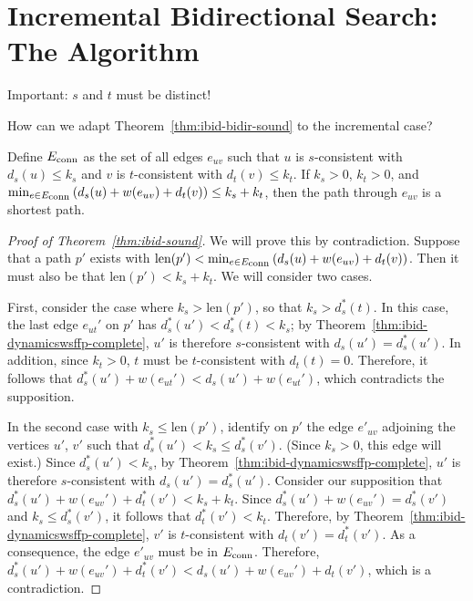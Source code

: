 \section{Incremental Bidirectional Search: The Algorithm}
\label{sef:ibid:ibid}

Important: $s$ and $t$ must be distinct!

How can we adapt Theorem~\ref{thm:ibid-bidir-sound}
to the incremental case?

\begin{theorem}
Define $E_{\mbox{\scriptsize conn}}$ as the set of all edges $e_{uv}$ such that
$u$ is $s$-consistent with $d_s(u) \leq k_s$
and $v$ is $t$-consistent with $d_t(v) \leq k_t$.
If $k_s > 0$, $k_t > 0$,
and
$\min_{e \in E_{\mbox{\scriptsize conn}}} \left( d_s(u) + w(e_{uv}) + d_t(v) \right)
   \leq k_s + k_t$,
then the path through $e_{uv}$ is a shortest path.
\label{thm:ibid-sound}
\end{theorem}

\begin{proof}[Proof of Theorem~\ref{thm:ibid-sound}]
We will prove this by contradiction.
Suppose that a path $p'$ exists with
$\mbox{len}(p') < \min_{e \in E_{\mbox{\scriptsize conn}}} \left( d_s(u) + w(e_{uv}) + d_t(v) \right)$.
Then it must also be that
$\mbox{len}(p') < k_s + k_t$.
We will consider two cases.

First, consider the case where $k_s > \mbox{len}(p')$,
so that $k_s > d_s^*(t)$.
In this case,
the last edge $e_{ut}'$ on $p'$
has $d_s^*(u') < d_s^*(t) < k_s$;
by Theorem~\ref{thm:ibid-dynamicswsffp-complete},
$u'$ is therefore $s$-consistent with $d_s(u') = d_s^*(u')$.
In addition,
since $k_t > 0$,
$t$ must be $t$-consistent with $d_t(t) = 0$.
Therefore,
it follows that $d_s^*(u') + w(e_{ut}') < d_s(u') + w(e_{ut}')$,
which contradicts the supposition.

In the second case with $k_s \leq \mbox{len}(p')$,
identify on $p'$ the edge $e'_{uv}$ adjoining the vertices $u'$, $v'$
such that $d_s^*(u') < k_s \leq d_s^*(v')$.
(Since $k_s > 0$, this edge will exist.)
Since $d_s^*(u') < k_s$,
by Theorem~\ref{thm:ibid-dynamicswsffp-complete},
$u'$ is therefore $s$-consistent with $d_s(u') = d_s^*(u')$.
Consider our supposition that
$d_s^*(u') + w(e_{uv}') + d_t^*(v') < k_s + k_t$.
Since $d_s^*(u') + w(e_{uv}') = d_s^*(v')$
and $k_s \leq d_s^*(v')$,
it follows that
$d_t^*(v') < k_t$.
Therefore,
by Theorem~\ref{thm:ibid-dynamicswsffp-complete},
$v'$ is $t$-consistent with $d_t(v') = d_t^*(v')$.
As a consequence,
the edge $e'_{uv}$ must be in $E_{\mbox{\scriptsize conn}}$.
Therefore,
$d_s^*(u') + w(e_{uv}') + d_t^*(v')
   < d_s(u') + w(e_{uv}') + d_t(v')$,
which is a contradiction.
\end{proof}

